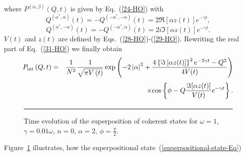 \documentclass[12pt,twoside,a4paper]{report}
\begin{document}
where 
$P^{\left( \alpha ,\beta \right) }\left( Q,t\right) $ 
is given by Eq.~(\ref{24-HO}) with
\begin{equation}
         Q^{\left( \alpha ^{*},\alpha \right) }\left( t\right) 
   =  -  Q^{\left(-\alpha ^{*},-\alpha \right) }\left( t\right) 
   =     2 \Re
                \left[\alpha z(t) \right] 
                e^{-\gamma t}, 
\label{32-HO}
\end{equation}
\begin{equation}
         Q^{\left( \alpha ^{*},-\alpha \right) }\left( t\right) 
   =  -  Q^{\left(
      -  \alpha ^{*},\alpha \right) }\left( t\right) 
   =     2{{i}} {\Im}
                 \left[\alpha z\left( t\right) \right] 
                 e^{-\gamma t}. 
\label{33-HO}
\end{equation}
$V\left( t\right) $ and $z\left( t\right) $ are defined by
Eqs.~(\ref{28-HO})-(\ref{29-HO}). Rewriting the real part of
Eq.~(\ref{31-HO}) we finally obtain
\begin{eqnarray}
  P_{\rm int}\left( Q,t\right) 
   &=&\frac 
        1
        {N^2}
        \frac 
                   1
                   {\sqrt{\pi V\left( t\right) }}
              \exp \left(
                      - 2\left| \alpha \right| ^2
                      + \frac
                             {  4 \left\{ 
                                      {\Im}
                                            \left[ \alpha z(t)\right] 
                                  \right\}^2
                                  e^{-2\gamma t}
                               -  Q^2}
                             {4 V(t) }
                   \right) \label{34-HO} \\ 
& &\times \Biggl. \cos 
                      \left\{ 
                            \phi 
                          - Q 
                            \frac
                                 {{\Im} [ \alpha z(t)] }
                                 {V(t)}
                             e^{-\gamma t}
                      \right\}
         . \nonumber
\end{eqnarray}\noindent
\noindent 
\footnotesize\begin{figure}[!h]\centering
    \parbox{7cm}
    {\rule{-1cm}{0cm}\epsfxsize=11cm}
\caption[Time evolution of the superposition of coherent states]
{\small  Time evolution of the superposition of coherent states for
  $\omega =1$, $\gamma =0.01\omega$, $n=0$, $\alpha =2$, $\phi =\frac
  \pi 2$.
\label{fig2}}
\end{figure}\normalsize
Figure~\ref{fig2} illustrates, how the superpositional state~(\ref{superpositional-state-Eq})
\end{document}
